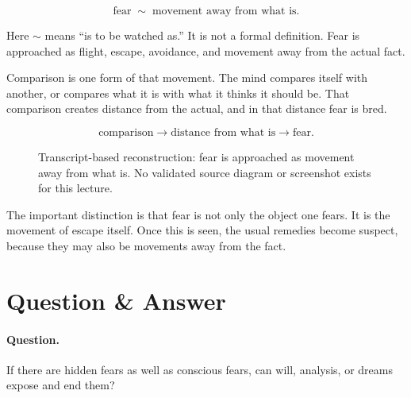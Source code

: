 \documentclass[11pt,oneside]{book}
\begin{document}
\begin{equation}
\text{fear}
\;\sim\;
\text{movement away from what is}.
\end{equation}

Here \(\sim\) means ``is to be watched as.'' It is not a formal definition. Fear is approached as flight, escape, avoidance, and movement away from the actual fact.

Comparison is one form of that movement. The mind compares itself with another, or compares what it is with what it thinks it should be. That comparison creates distance from the actual, and in that distance fear is bred.

\begin{equation}
\text{comparison}
\longrightarrow
\text{distance from what is}
\longrightarrow
\text{fear}.
\end{equation}

\begin{figure}
\centering
{}

Transcript-based reconstruction: fear is approached as movement away from what is. No validated source diagram or screenshot exists for this lecture.
\end{figure}

The important distinction is that fear is not only the object one fears. It is the movement of escape itself. Once this is seen, the usual remedies become suspect, because they may also be movements away from the fact.

\section{Question \& Answer}

\paragraph{Question.}
If there are hidden fears as well as conscious fears, can will, analysis, or dreams expose and end them?
\end{document}
